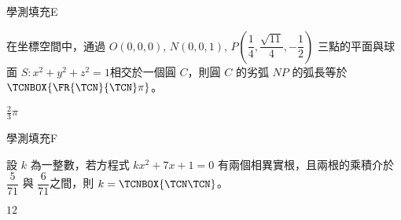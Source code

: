     \begin{QUESTION}
        \begin{ExamInfo}{92}{學測}{填充}{E}
        \end{ExamInfo}
        \begin{ExamAnsRateInfo}{21}{37}{17}{9}
        \end{ExamAnsRateInfo}
        \begin{QBODY}
            在坐標空間中，通過 $O(0,0,0)$, $N(0,0,1)$, $P(\dfrac{1}{4}, \dfrac{\sqrt{11}}{4}, -\dfrac{1}{2})$ 三點的平面與球面  $S: x^2+y^2+z^2=1$相交於一個圓 $C$，則圓 $C$ 的劣弧 $NP$ 的弧長等於 
            $\TCNBOX{\FR{\TCN}{\TCN} \pi} $。
        \end{QBODY}
        \begin{QFROMS}
        \end{QFROMS}
        \begin{QTAGS}\end{QTAGS}
        \begin{QANS}
            $\frac{2}{3}\pi$
        \end{QANS}
        \begin{QSOLLIST}
        \end{QSOLLIST}
        \begin{QEMPTYSPACE}
        \end{QEMPTYSPACE}
    \end{QUESTION}
    \begin{QUESTION}
        \begin{ExamInfo}{92}{學測}{填充}{F}
        \end{ExamInfo}
        \begin{ExamAnsRateInfo}{35}{67}{31}{7}
        \end{ExamAnsRateInfo}
        \begin{QBODY}
            設 $k$ 為一整數，若方程式 $kx^2 + 7x +1= 0$ 有兩個相異實根，且兩根的乘積介於 $\dfrac{5}{71}$ 與 $\dfrac{6}{71}$之間，則 $k=\TCNBOX{\TCN\TCN}$。
        \end{QBODY}
        \begin{QFROMS}
        \end{QFROMS}
        \begin{QTAGS}\end{QTAGS}
        \begin{QANS}
            $12$
        \end{QANS}
        \begin{QSOLLIST}
        \end{QSOLLIST}
        \begin{QEMPTYSPACE}
        \end{QEMPTYSPACE}
    \end{QUESTION}
